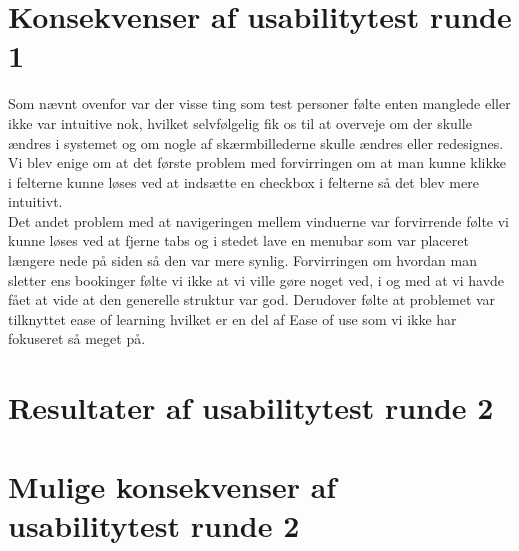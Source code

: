 \section{Konsekvenser af usabilitytest runde 1}
Som nævnt ovenfor var der visse ting som test personer følte enten manglede eller ikke var intuitive nok, hvilket selvfølgelig fik os til at overveje om der skulle ændres i systemet og om nogle af skærmbillederne skulle ændres eller redesignes. \\Vi blev enige om at det første problem med forvirringen om at man kunne klikke i felterne kunne løses ved at indsætte en checkbox i felterne så det blev mere intuitivt.\\ Det andet problem med at navigeringen mellem vinduerne var forvirrende følte vi kunne løses ved at fjerne tabs og i stedet lave en menubar som var placeret længere nede på siden så den var mere synlig. 
Forvirringen om hvordan man sletter ens bookinger følte vi ikke at vi ville gøre noget ved, i og med at vi havde fået at vide at den generelle struktur var god. Derudover følte at problemet var tilknyttet ease of learning hvilket er en del af Ease of use som vi ikke har fokuseret så meget på.
\section{Resultater af usabilitytest runde 2}
\section{Mulige konsekvenser af usabilitytest runde 2}